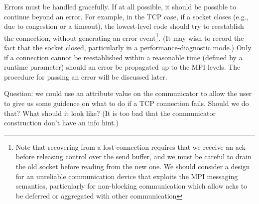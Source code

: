 Errors must be handled gracefully.  If at all possible, it should be possible
to continue beyond an error.  For example, in the TCP case, if a socket closes
(e.g., due to congestion or a timeout), the lowest-level code should try to
reestablish the connection, without generating an error event\footnote{Note
  that recovering from a lost connection requires that we receive an ack
  before releasing control over the send buffer, and we must be careful to
  drain the old socket before reading from the new one.  We should consider a
  design for an unreliable communication device that exploits the MPI
  messaging semantics, particularly for non-blocking communication which allow
  acks to be deferred or aggregated with other communication}.  (It may wish
to record the fact that the socket closed, particularly in a
performance-diagnostic mode.)  Only if a connection cannot be reestablished
within a reasonable time (defined by a runtime parameter) should an error be
propagated up to the MPI levels.  The procedure for passing an error will be
discussed later.

Question: we could use an attribute value on the communicator to allow
the user to give us some guidence on what to do if a TCP connection
fails.  Should we do that?  What should it look like? (It is too bad
that the communicator construction don't have an info hint.)

